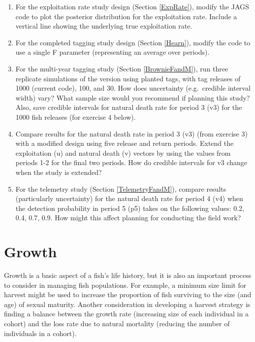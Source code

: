 \documentclass[
]{krantz}
\begin{document}
\begin{enumerate}
\def\labelenumi{\arabic{enumi}.}
\item
  For the exploitation rate study design (Section \ref{ExpRate}), modify the JAGS code to plot the posterior distribution for the exploitation rate. Include a vertical line showing the underlying true exploitation rate.
\item
  For the completed tagging study design (Section \ref{Hearn}), modify the code to use a single F parameter (representing an average over periods).
\item
  For the multi-year tagging study (Section \ref{BrownieFandM}), run three replicate simulations of the version using planted tags, with tag releases of 1000 (current code), 100, and 30. How does uncertainty (e.g.~credible interval width) vary? What sample size would you recommend if planning this study? Also, save credible intervals for natural death rate for period 3 (v3) for the 1000 fish releases (for exercise 4 below).
\item
  Compare results for the natural death rate in period 3 (v3) (from exercise 3) with a modified design using five release and return periods. Extend the exploitation (u) and natural death (v) vectors by using the values from periods 1-2 for the final two periods. How do credible intervals for v3 change when the study is extended?
\item
  For the telemetry study (Section \ref{TelemetryFandM}), compare results (particularly uncertainty) for the natural death rate for period 4 (v4) when the detection probability in period 5 (p5) takes on the following values: 0.2, 0.4, 0.7, 0.9. How might this affect planning for conducting the field work?
\end{enumerate}

\hypertarget{Growth}{%
\chapter{Growth}\label{Growth}}

Growth is a basic aspect of a fish's life history, but it is also an important process to consider in managing fish populations. For example, a minimum size limit for harvest might be used to increase the proportion of fish surviving to the size (and age) of sexual maturity. Another consideration in developing a harvest strategy is finding a balance between the growth rate (increasing size of each individual in a cohort) and the loss rate due to natural mortality (reducing the number of individuals in a cohort).
\end{document}
